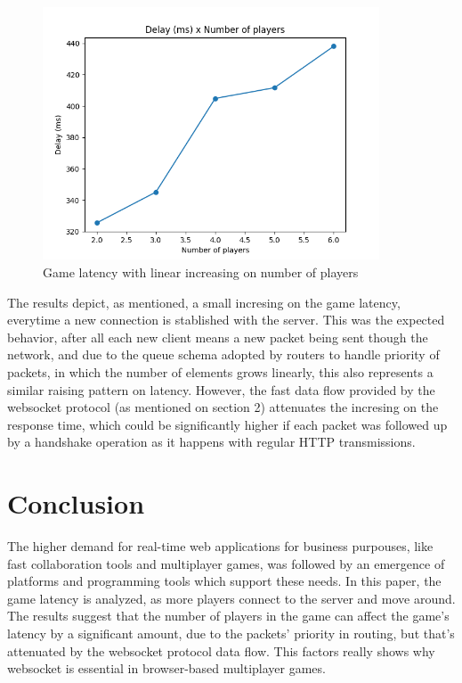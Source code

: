 \documentclass[english]{sbrt}
\begin{document}
\begin{figure}[H]
  \centering
  \includegraphics[width=10cm]{graphs/graph.png}
  \caption{Game latency with linear increasing on number of players}
  \label{latency}
\end{figure}

The results depict, as mentioned, a small incresing on the game latency, everytime a new connection is stablished with the server. This was the expected behavior, after all each new client means a new packet being sent though the network, and due to the queue schema adopted by routers to handle priority of packets, in which the number of elements grows linearly, this also represents a similar raising pattern on latency. However, the fast data flow provided by the websocket protocol (as mentioned on section 2) attenuates the incresing on the response time, which could be significantly higher if each packet was followed up by a handshake operation as it happens with regular HTTP transmissions.

\section{\textbf{Conclusion}}

The higher demand for real-time web applications for business purpouses, like fast collaboration tools and multiplayer games, was followed by an emergence of platforms and programming tools which support these needs. In this paper, the game latency is analyzed, as more players connect to the server and move around. The results suggest that the number of players in the game can affect the game's latency by a significant amount, due to the packets' priority in routing, but that's attenuated by the websocket protocol data flow. This factors really shows why websocket is essential in browser-based multiplayer games.

\cite{chen2011framework}



\end{document}
